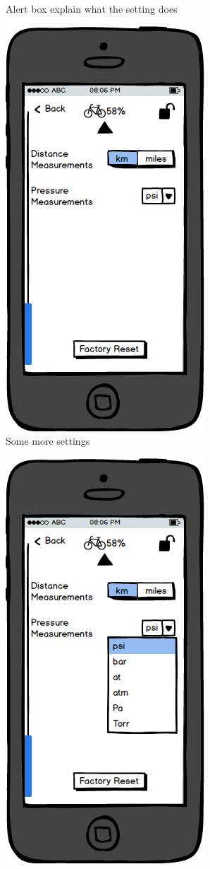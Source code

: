 \documentclass[a4paper]{report}
\begin{document}
{\begin{figure}
\caption{Alert box explain what the setting does}
\end{figure}
\clearpage
\begin{figure}
\centering
\includegraphics[scale=0.9]{figures/prototype_2/settings_2}
\caption{Some more settings}
\end{figure}
\clearpage
\begin{figure}
\centering
\includegraphics[scale=0.9]{figures/prototype_2/settings_2_check}

\end{figure}}
\end{document}
